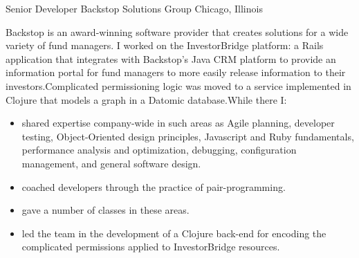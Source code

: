 \documentclass[11pt,letterpaper]{moderncv}
\begin{document}
 {Senior Developer} {Backstop Solutions Group} {Chicago, Illinois} {} {%
  Backstop is an award-winning software provider that creates solutions for a
  wide variety of fund managers.  I worked on the InvestorBridge platform: a
  Rails application that integrates with Backstop's Java CRM platform to
  provide an information portal for fund managers to more easily release
  information to their investors.\newline Complicated permissioning logic was moved
  to a service implemented in Clojure that models a graph in a Datomic
  database.\newline While there I:
  \begin{itemize}
  \item shared expertise company-wide in such areas as Agile planning,
    developer testing, Object-Oriented design principles, Javascript
    and Ruby fundamentals, performance analysis and optimization,
    debugging, configuration management, and general software design.
  \item coached developers through the practice of pair-programming.
  \item gave a number of classes in these areas.
  \item led the team in the development of a Clojure back-end for encoding the
    complicated permissions applied to InvestorBridge resources.
  \end{itemize}
}
\end{document}
